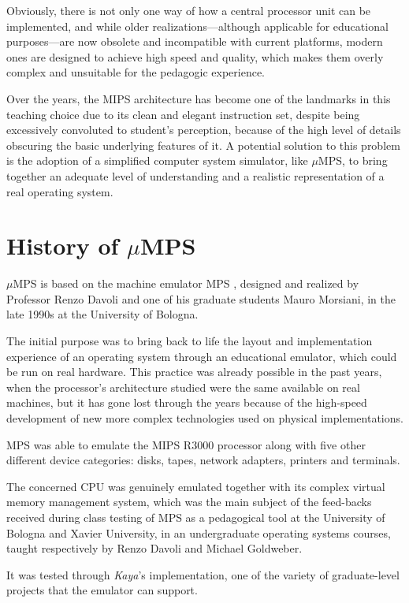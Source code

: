 \documentclass[12pt,a4paper,openright,twoside]{report}
\begin{document}
	Obviously, there is not only one way of how a central processor unit can be implemented, and while older realizations---although applicable for educational purposes---are now obsolete and incompatible with current platforms, modern ones are designed to achieve high speed and quality, which makes them overly complex and unsuitable for the pedagogic experience.
	
	Over the years, the MIPS architecture has become one of the landmarks in this teaching choice due to its clean and elegant instruction set, despite being excessively convoluted to student’s perception, because of the high level of details obscuring the basic underlying features of it.
	A potential solution to this problem is the adoption of a simplified computer system simulator, like $\mu$MPS, to bring together an adequate level of understanding and a realistic representation of a real operating system.

\section{History of $\mu$MPS}
	$\mu$MPS is based on the machine emulator MPS \cite{mps}, designed and realized by Professor Renzo Davoli and one of his graduate students Mauro Morsiani, in the late 1990s at the University of Bologna.
	
	The initial purpose was to bring back to life the layout and implementation experience of an operating system through an educational emulator, which could be run on real hardware.
	This practice was already possible in the past years, when the processor's architecture studied were the same available on real machines, but it has gone lost through the years because of the high-speed development of new more complex technologies used on physical implementations.
	
	MPS was able to emulate the MIPS R3000 processor along with five other different device categories: disks, tapes, network adapters, printers and terminals.
	
	The concerned CPU was genuinely emulated together with its complex virtual memory management system, which was the main subject of the feed-backs received during class testing of MPS as a pedagogical tool at the University of Bologna and Xavier University, in an undergraduate operating systems courses, taught respectively by Renzo Davoli and Michael Goldweber.
	
	It was tested through \textit{Kaya}'s \cite{kaya} implementation, one of the variety of graduate-level projects that the emulator can support.
	
\end{document}
